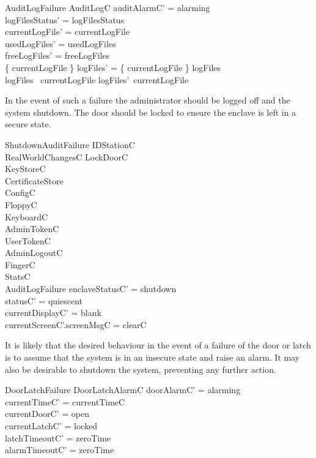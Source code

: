 \begin{schema}{AuditLogFailure}
	\Delta AuditLogC
\where
	auditAlarmC' = alarming
\\      logFilesStatus' = logFilesStatus
\\      currentLogFile' = currentLogFile
\\      usedLogFiles' = usedLogFiles
\\      freeLogFiles' = freeLogFiles
\\      \{ currentLogFile \} \ndres logFiles' = \{ currentLogFile \}
\ndres logFiles
\\      logFiles~ currentLogFile \subseteq logFiles'~currentLogFile	
\end{schema}

In the event of such a failure the administrator should be logged off
and the system shutdown. The door should be locked to ensure the
enclave is left in a secure state.

\begin{schema}{ShutdownAuditFailure}
	\Delta IDStationC
\\      RealWorldChangesC
\also
        LockDoorC
\\	\Xi KeyStoreC
\\	\Xi CertificateStore
\\	\Xi ConfigC
\\      \Xi FloppyC
\\      \Xi KeyboardC
\\      \Xi AdminTokenC
\\      \Xi UserTokenC
\\      AdminLogoutC
\\      \Xi FingerC
\\      \Xi StatsC
\\      AuditLogFailure
\where
	enclaveStatusC' = shutdown
\\	statusC' = quiescent
\also
\\	currentDisplayC' = blank
\\	currentScreenC'.screenMsgC = clearC
\end{schema}

It is likely that the desired behaviour in the event of a failure of
the door or latch is to assume that the system is in an insecure state
and raise an alarm. It may also be desirable to shutdown the system,
preventing any further action. 

\begin{schema}{DoorLatchFailure}
	\Delta DoorLatchAlarmC
\where
	doorAlarmC' = alarming
\\	currentTimeC' = currentTimeC
\\	currentDoorC' = open
\\	currentLatchC' = locked
\\	latchTimeoutC' = zeroTime
\\	alarmTimeoutC' = zeroTime
\end{schema}

